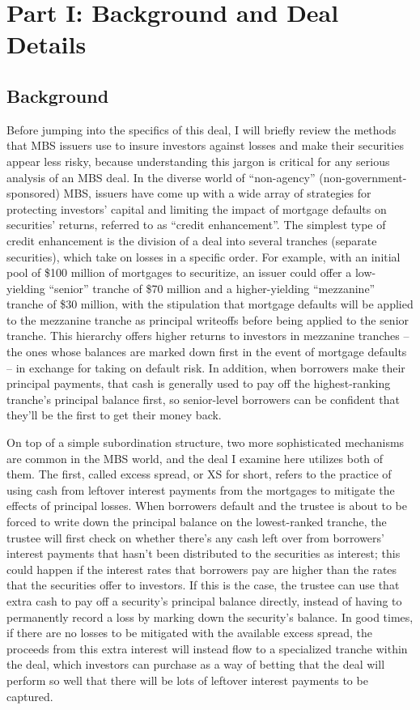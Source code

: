 \documentclass[12pt]{article}
\begin{document}
\section*{Part I: Background and Deal Details}
\subsection*{Background}
Before jumping into the specifics of this deal, I will briefly review the methods that MBS issuers use to insure investors against losses and make their securities appear less risky, because understanding this jargon is critical for any serious analysis of an MBS deal. In the diverse world of “non-agency” (non-government-sponsored) MBS, issuers have come up with a wide array of strategies for protecting investors’ capital and limiting the impact of mortgage defaults on securities’ returns, referred to as ``credit enhancement''. The simplest type of credit enhancement is the division of a deal into several tranches (separate securities), which take on losses in a specific order. For example, with an initial pool of \$100 million of mortgages to securitize, an issuer could offer a low-yielding “senior” tranche of \$70 million and a higher-yielding “mezzanine” tranche of \$30 million, with the stipulation that mortgage defaults will be applied to the mezzanine tranche as principal writeoffs before being applied to the senior tranche. This hierarchy offers higher returns to investors in mezzanine tranches – the ones whose balances are marked down first in the event of mortgage defaults – in exchange for taking on default risk. In addition, when borrowers make their principal payments, that cash is generally used to pay off the highest-ranking tranche’s principal balance first, so senior-level borrowers can be confident that they’ll be the first to get their money back.
	
On top of a simple subordination structure, two more sophisticated mechanisms are common in the MBS world, and the deal I examine here utilizes both of them. The first, called excess spread, or XS for short, refers to the practice of using cash from leftover interest payments from the mortgages to mitigate the effects of principal losses. When borrowers default and the trustee is about to be forced to write down the principal balance on the lowest-ranked tranche, the trustee will first check on whether there’s any cash left over from borrowers’ interest payments that hasn’t been distributed to the securities as interest; this could happen if the interest rates that borrowers pay are higher than the rates that the securities offer to investors. If this is the case, the trustee can use that extra cash to pay off a security’s principal balance directly, instead of having to permanently record a loss by marking down the security’s balance. In good times, if there are no losses to be mitigated with the available excess spread, the proceeds from this extra interest will instead flow to a specialized tranche within the deal, which investors can purchase as a way of betting that the deal will perform so well that there will be lots of leftover interest payments to be captured.
	
\end{document}
